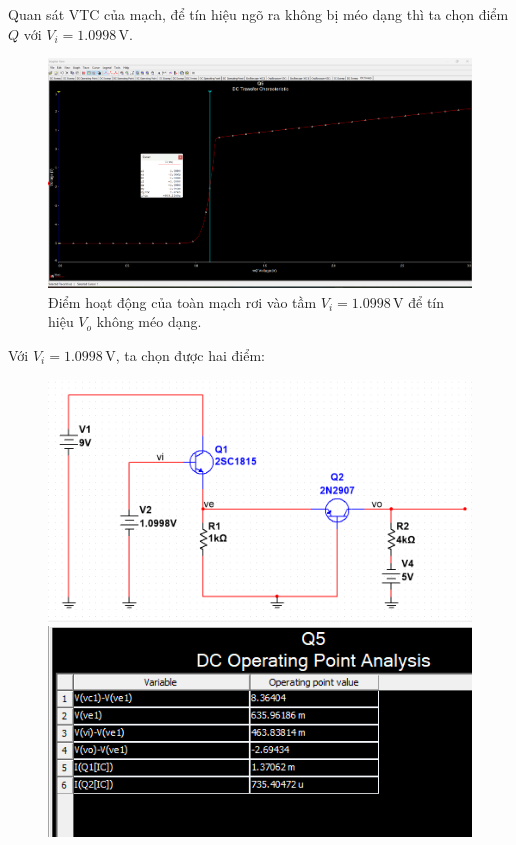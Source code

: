 Quan sát VTC của mạch, để tín hiệu ngõ ra không bị méo dạng thì ta chọn điểm $Q$ với $V_{i} = 1.0998\,\text{V}$.

\begin{figure}[H]
	\centering
	\includegraphics[width=.9\linewidth]{./my-chapters/my-images/Question5/b_Q_tong.png}
	\caption{Điểm hoạt động của toàn mạch rơi vào tầm $V_{i} = 1.0998\,\text{V}$ để tín hiệu $V_{o}$ không méo dạng.}
\end{figure}

Với $V_{i} = 1.0998\,\text{V}$, ta chọn được hai điểm:

\begin{figure}[H]
	\centering
	\begin{minipage}{.4\linewidth}
		\includegraphics[width=\linewidth]{./my-chapters/my-images/Question5/b_Q_tong_hinh.png}
	\end{minipage}
	\begin{minipage}{.5\linewidth}
		\includegraphics[width=\linewidth]{./my-chapters/my-images/Question5/b_Q_tong_bang.png}
	\end{minipage}
\end{figure}


